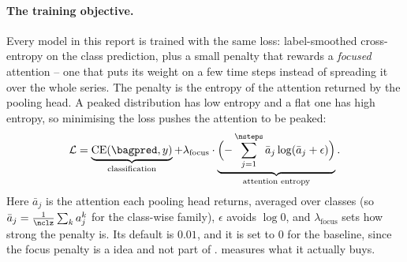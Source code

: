 \paragraph{The training objective.}
Every model in this report is trained with the same loss: label-smoothed cross-entropy on the class
prediction, plus a small penalty that rewards a \emph{focused} attention -- one that puts its weight
on a few time steps instead of spreading it over the whole series. The penalty is the entropy of the
attention returned by the pooling head. A peaked distribution has low entropy and a flat one has
high entropy, so minimising the loss pushes the attention to be peaked:
\begin{equation}
  \mathcal{L} = \underbrace{\mathrm{CE}(\bagpred, y)}_{\text{classification}}
              + \lambda_{\text{focus}} \cdot
                \underbrace{\Big({-}\sum_{j=1}^{\nsteps} \bar a_j \log(\bar a_j + \epsilon)\Big)}_{\text{attention entropy}} .
  \label{eq:loss}
\end{equation}
Here $\bar a_j$ is the attention each pooling head returns, averaged over classes (so
$\bar a_j = \frac{1}{\nclz}\sum_k a_j^k$ for the class-wise family), $\epsilon$ avoids $\log 0$, and
$\lambda_{\text{focus}}$ sets how strong the penalty is. Its default is $0.01$, and it is
set to $0$ for the \millet{} baseline, since the focus penalty is a \seanet{} idea and not part of
\millet{}.  measures what it actually buys.

